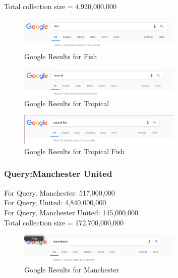 \documentclass[12pt]{report}
\begin{document}
Total collection size = 4,920,000,000\\

\begin{figure}[ht] 
  \centering
  \includegraphics[width=0.7\textwidth]{Google_fish.png}
  \caption{Google Results for Fish}
  \label{fig:19}
\end{figure}

\begin{figure}[ht] 
  \centering
  \includegraphics[width=0.7\textwidth]{Google_tropical.png}
  \caption{Google Results for Tropical}
  \label{fig:20}
\end{figure}

\begin{figure}[ht] 
  \centering
  \includegraphics[width=0.7\textwidth]{Google_tropicalfish.png}
  \caption{Google Results for Tropical Fish}
  \label{fig:21}
\end{figure}

\subsubsection{Query:Manchester United}
For Query, Manchester: 517,000,000\\
For Query, United: 4,840,000,000\\
For Query, Manchester United: 145,000,000\\

Total collection size = 172,700,000,000\\


\begin{figure}[ht] 
  \centering
  \includegraphics[width=0.7\textwidth]{Google_manchester.png}
  \caption{Google Results for Manchester}
  \label{fig:22}
\end{figure}
\end{document}
